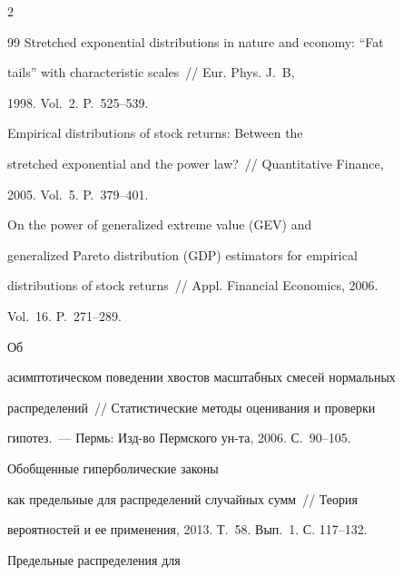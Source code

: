 \begin{multicols}{2}
{{\begin{thebibliography}{99}
Stretched exponential distributions in nature and economy: ``Fat


tails'' with characteristic scales~// Eur. Phys. J.~B,


1998. Vol.~2. P.~525--539.







 Empirical distributions of stock returns: Between the


stretched exponential and the power law?~// Quantitative Finance,


2005. Vol.~5. P.~379--401.







 On the power of generalized extreme value (GEV) and


generalized Pareto distribution (GDP) estimators for empirical


distributions of stock returns~// Appl. Financial Economics, 2006.


Vol.~16. P.~271--289.







 Об


асимптотическом поведении хвостов масштабных смесей нормальных


распределений~// Статистические методы оценивания и проверки


гипотез.~--- Пермь: Изд-во Пермского ун-та, 2006. С.~90--105.





  Обобщенные гиперболические законы


как предельные для распределений случайных сумм~// Теория


вероятностей и ее применения, 2013. Т.~58. Вып.~1. С. 117--132.







 Предельные распределения для



\end{thebibliography}}}
\end{multicols}
